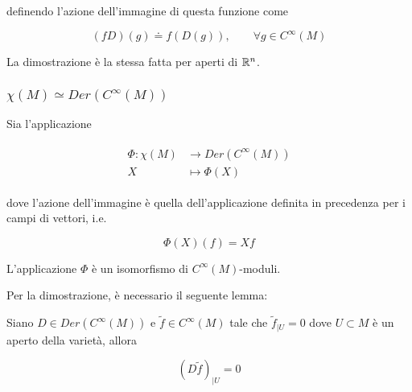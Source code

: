 definendo l'azione dell'immagine di questa funzione come

\begin{equation}
	(f D)(g) \doteq f (D(g)), \qquad \forall g \in C^{\infty}(M)
\end{equation}

La dimostrazione è la stessa fatta per aperti di $ \mathbb{R}^{n} $.

\subsubsection{$ \chi(M) \simeq Der(C^{\infty}(M)) $}

\begin{theorem}
	Sia l'applicazione
	
	\begin{align}
		\begin{split}
			\Phi : \chi(M) &\to Der(C^{\infty}(M))\\
			X &\mapsto \Phi(X)
		\end{split}
	\end{align}

	dove l'azione dell'immagine è quella dell'applicazione definita in precedenza per i campi di vettori, i.e.
	
	\begin{equation}
		\Phi(X)(f) = X f
	\end{equation}

	L'applicazione $ \Phi $ è un isomorfismo di $ C^{\infty}(M) $-moduli.
\end{theorem}

Per la dimostrazione, è necessario il seguente lemma:

\begin{lemma}
	Siano $ D \in Der(C^{\infty}(M)) $ e $ \tilde{f} \in C^{\infty}(M) $ tale che $ \tilde{f}_{|U} = 0 $ dove $ U \subset M $ è un aperto della varietà, allora
	
	\begin{equation}
		(D \tilde{f})_{|U} = 0
	\end{equation}
\end{lemma}

